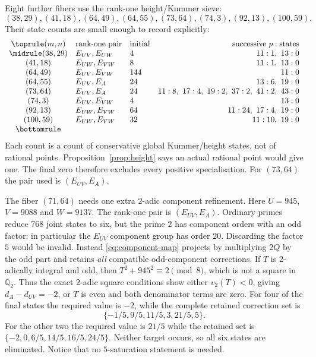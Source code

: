 \documentclass[11pt,a4paper]{amsart}
\newcommand{\Q}{\mathbb Q}
\begin{document}
Eight further fibers use the rank-one height/Kummer sieve:
\[
(38,29),(41,18),(64,49),(64,55),(73,64),(74,3),(92,13),(100,59).
\]
Their state counts are small enough to record explicitly:
\begin{equation}\label{eq:height-states}
\begin{array}{cllr}
\toprule
(m,n)&\text{rank-one pair}&\text{initial}&\text{successive }p:\text{states}\\
\midrule
(38,29)&E_{UV},E_{UW}&4&11:1,\ 13:0\\
(41,18)&E_{UW},E_{VW}&8&11:1,\ 13:0\\
(64,49)&E_{UV},E_{VW}&144&11:0\\
(64,55)&E_{UV},E_A&24&13:6,\ 19:0\\
(73,64)&E_{UV},E_A&24&11:8,\ 17:4,\ 19:2,\ 37:2,\ 41:2,\ 43:0\\
(74,3)&E_{UV},E_{VW}&4&13:0\\
(92,13)&E_{UW},E_{VW}&64&11:24,\ 17:4,\ 19:0\\
(100,59)&E_{UW},E_{VW}&32&11:10,\ 19:0\\
\bottomrule
\end{array}
\end{equation}
Each count is a count of conservative global Kummer/height states, not of rational points. Proposition~\ref{prop:height} says an actual rational point would give one. The final zero therefore excludes every positive specialisation. For $(73,64)$ the pair used is $(E_{UV},E_A)$.

The fiber $(71,64)$ needs one extra $2$-adic component refinement. Here $U=945$, $V=9088$ and $W=9137$. The rank-one pair is $(E_{UV},E_A)$. Ordinary primes reduce 768 joint states to six, but the prime $2$ has component orders with an odd factor: in particular the $E_{UV}$ component group has order $20$. Discarding the factor $5$ would be invalid. Instead \eqref{eq:component-map} projects by multiplying $2Q$ by the odd part and retains \emph{all} compatible odd-component corrections. If $T$ is $2$-adically integral and odd, then $T^2+945^2\equiv2\pmod8$, which is not a square in $\Q_2$. Thus the exact $2$-adic square conditions show either $v_2(T)<0$, giving $d_A-d_{UV}=-2$, or $T$ is even and both denominator terms are zero. For four of the final states the required value is $-2$, while the complete retained correction set is
\[
\{-1/5,9/5,11/5,3,21/5,5\}.
\]
For the other two the required value is $21/5$ while the retained set is $\{-2,0,6/5,14/5,16/5,24/5\}$. Neither target occurs, so all six states are eliminated. Notice that no $5$-saturation statement is needed.
\end{document}
